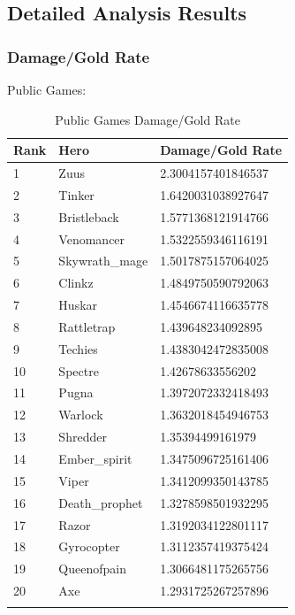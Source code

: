 \documentclass{article}
\begin{document}
\subsection{Detailed Analysis Results}

\subsubsection{Damage/Gold Rate}

Public Games:

\begin{longtable}{|p{2.5cm}|p{2.5cm}|p{5.5cm}|}

\hline
\textbf{Rank} & \textbf{Hero} & \textbf{Damage/Gold Rate} \\
\hline
\endhead

1 & Zuus & 2.3004157401846537 \\\hline
2 & Tinker & 1.6420031038927647 \\\hline
3 & Bristleback & 1.5771368121914766 \\\hline
4 & Venomancer & 1.5322559346116191 \\\hline
5 & Skywrath\_mage & 1.5017875157064025 \\\hline
6 & Clinkz & 1.4849750590792063 \\\hline
7 & Huskar & 1.4546674116635778 \\\hline
8 & Rattletrap & 1.439648234092895 \\\hline
9 & Techies & 1.4383042472835008 \\\hline
10 & Spectre & 1.42678633556202 \\\hline
11 & Pugna & 1.3972072332418493 \\\hline
12 & Warlock & 1.3632018454946753 \\\hline
13 & Shredder & 1.35394499161979 \\\hline
14 & Ember\_spirit & 1.3475096725161406 \\\hline
15 & Viper & 1.3412099350143785 \\\hline
16 & Death\_prophet & 1.3278598501932295 \\\hline
17 & Razor & 1.3192034122801117 \\\hline
18 & Gyrocopter & 1.3112357419375424 \\\hline
19 & Queenofpain & 1.3066481175265756 \\\hline
20 & Axe & 1.2931725267257896 \\\hline


\caption{Public Games Damage/Gold Rate}
\label{public-games-damage-gold-rate}
\end{longtable}
\end{document}

